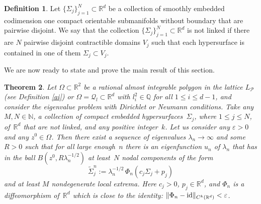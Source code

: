 \documentclass{amsart}
\newtheorem{theorem}{Theorem}[section]
\theoremstyle{definition}
\newtheorem{definition}[theorem]{Definition}
\theoremstyle{remark}
\newcommand{\ep}{\varepsilon}
\newcommand{\la}{\lambda}
\newcommand{\Si}{\Sigma}
\def\NN{\mathbb{N}}
\def\RR{\mathbb{R}}
\newcommand{\id}{{\rm id}}
\renewcommand\leq\leqslant
\numberwithin{equation}{section}
\theoremstyle{definition}
\theoremstyle{remark}
\def\RR{\mathbb{R}}
\def\NN{\mathbb{N}}
\begin{document}
\begin{definition}\label{link}
Let $\{\Si_j\}_{j=1}^N\subset\mathbb R^d$ be a collection of smoothly embedded codimension one compact orientable submanifolds without boundary that are pairwise disjoint. We say that the collection $\{\Si_j\}_{j=1}^N\subset\mathbb R^d$ is not linked if there are $N$ pairwise disjoint contractible domains $V_j$ such that each hypersurface is contained in one of them $\Sigma_j\subset V_j$.
\end{definition}
We are now ready to state and prove the main result of this section.
\begin{theorem}\label{nsandcp}
	Let $\Omega\subset\mathbb{R}^{2}$ be a rational almost integrable polygon in the lattice $L_\mathcal{P}$ (see Definition \ref{ai})  or $\Omega=\mathcal{Q}_l\subset\mathbb{R}^{d}$ with $ l_i^2\in \mathbb{Q}$ for all $1\leq i\leq d-1$, and consider the eigenvalue problem  with Dirichlet or Neumann conditions. Take any~$M,N\in\NN$, a collection of compact embedded hypersurfaces~$\Si_j$, where $1\leq j\leq N$, of~$\RR^d$ that are not linked, and any positive integer~$k$. Let us consider any $\ep>0$ and any  $z^0\in\Omega$. Then there exist a sequence of eigenvalues $\la_n\to\infty$ and  some~$R>0$ such that for all large enough~$n$ there is an eigenfunction $u_n$ of $\lambda_n$ that has in the ball $B\left(z^0,R\la_n^{-1/2}\right)$ at least~$N$ nodal components of the form
	\begin{equation}
	\widetilde\Si_j^n:= \la_n^{-1/2} \,  \Phi_{n}(c_j \Si_j + p_j)
	\end{equation}
	and at least $M$ nondegenerate local extrema. Here $c_j>0$, $p_j\in\RR^d$, and $\Phi_n$ is a diffeomorphism of~$\RR^d$ which is close to the identity:
	$  \|\Phi_n-\id\|_{C^k(\RR^d)}<\ep$.
\end{theorem}
\end{document}
